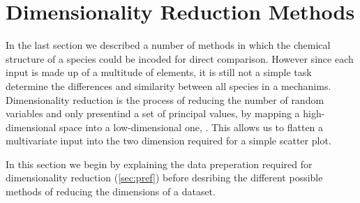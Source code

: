 \section{ Dimensionality Reduction Methods}
In the last section we described a number of methods in which the chemical structure of a species could be incoded for direct comparison. However since each input is made up of a multitude of elements, it is still not a simple task determine the differences and similarity between all species in a mechanims. Dimensionality reduction is the process of reducing the number of random variables and only presentind a set of principal values, by mapping a high-dimensional space into a low-dimensional one, \citep{drrandom}. This allows us to flatten a multivariate input into the two dimension required for a simple scatter plot.

In this section we begin by explaining the data preperation required for dimensionality reduction (\autoref{sec:pref}) before desribing the different possible methods of reducing the dimensions of a dataset. 

% 
% 
% 
% 



